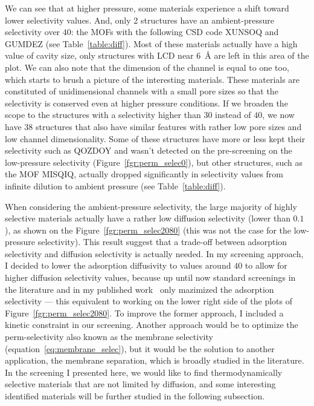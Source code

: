 \documentclass[main]{subfiles}
\begin{document}
We can see that at higher pressure, some materials experience a shift toward lower selectivity values. And, only 2 structures have an ambient-pressure selectivity over $40$: the MOFs with the following CSD code XUNSOQ\autocite{Abrahams_2014} and GUMDEZ\autocite{Yin_2014}  (see Table~\ref{table:diff}). Most of these materials actually have a high value of cavity size, only structures with LCD near \SI{6}{\angstrom} are left in this area of the plot. We can also note that the dimension of the channel is equal to one too, which starts to brush a picture of the interesting materials. These materials are constituted of unidimensional channels with a small pore sizes so that the selectivity is conserved even at higher pressure conditions. If we broaden the scope to the structures with a selectivity higher than $30$ instead of $40$, we now have 38 structures that also have similar features with rather low pore sizes and low channel dimensionality. Some of these structures have more or less kept their selectivity such as QOZDOY\autocite{Zhang_2001} and wasn't detected on the pre-screening on the low-pressure selectivity (Figure~\ref{fgr:perm_selec0}), but other structures, such as the MOF MISQIQ\autocite{Tong_2013}, actually dropped significantly in selectivity values from infinite dilution to ambient pressure (see Table~\ref{table:diff}). 

When considering the ambient-pressure selectivity, the large majority of highly selective materials actually have a rather low diffusion selectivity (lower than $0.1$), as shown on the Figure~\ref{fgr:perm_selec2080} (this was not the case for the low-pressure selectivity). This result suggest that a trade-off between adsorption selectivity and diffusion selectivity is actually needed. In my screening approach, I decided to lower the adsorption diffusivity to values around $40$ to allow for higher diffusion selectivity values, because up until now standard screenings in the literature\autocite{Simon_2015,Chung_2019} and in my published work~\cite{Ren_2021} only mazimized the adsorption selectivity --- this equivalent to working on the lower right side of the plots of Figure~\ref{fgr:perm_selec2080}. To improve the former approach, I included a kinetic constraint in our screening. Another approach would be to optimize the perm-selectivity also known as the membrane selectivity (equation~\ref{eq:membrane_selec}), but it would be the solution to another application, the membrane separation, which is broadly studied in the literature\autocite{Anderson_2017,Wang_2022}. In the screening I presented here, we would like to find thermodynamically selective materials that are not limited by diffusion, and some interesting identified materials will be further studied in the following subsection. 
\end{document}
